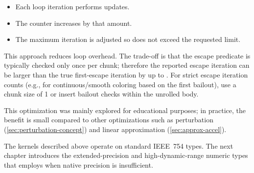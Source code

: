 \begin{itemize}
  \item Each loop iteration performs  updates.
  \item The counter  increases by that amount.
  \item The maximum iteration  is adjusted so 
        does not exceed the requested limit.
\end{itemize}

This approach reduces loop overhead. The trade-off is that the escape predicate
is typically checked only once per chunk; therefore the reported escape
iteration can be larger than the true first-escape iteration by up to
. For strict escape iteration counts (e.g., for
continuous/smooth coloring based on the first bailout), use a chunk size of 1 or
insert bailout checks within the unrolled body.

This optimization was mainly explored for educational purposes; in practice, the
benefit is small compared to other optimizations such as perturbation (\cref{sec:perturbation-concept}) and linear
approximation (\cref{sec:approx-accel}).

The kernels described above operate on standard IEEE~754 types.  The next
chapter introduces the extended-precision and high-dynamic-range numeric types
that \FractalShark{} employs when native precision is insufficient.
